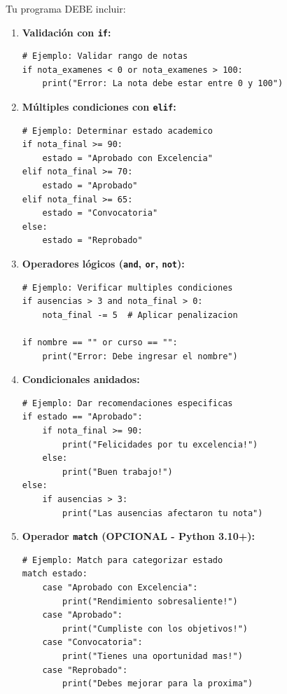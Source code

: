 \documentclass[12pt,a4paper]{article}
\begin{document}
Tu programa DEBE incluir:

\begin{enumerate}[leftmargin=*]
    \item \textbf{Validación con \texttt{if}:}
    \begin{lstlisting}
# Ejemplo: Validar rango de notas
if nota_examenes < 0 or nota_examenes > 100:
    print("Error: La nota debe estar entre 0 y 100")
    \end{lstlisting}
    
    \item \textbf{Múltiples condiciones con \texttt{elif}:}
    \begin{lstlisting}
# Ejemplo: Determinar estado academico
if nota_final >= 90:
    estado = "Aprobado con Excelencia"
elif nota_final >= 70:
    estado = "Aprobado"
elif nota_final >= 65:
    estado = "Convocatoria"
else:
    estado = "Reprobado"
    \end{lstlisting}
    
    \item \textbf{Operadores lógicos (\texttt{and}, \texttt{or}, \texttt{not}):}
    \begin{lstlisting}
# Ejemplo: Verificar multiples condiciones
if ausencias > 3 and nota_final > 0:
    nota_final -= 5  # Aplicar penalizacion
    
if nombre == "" or curso == "":
    print("Error: Debe ingresar el nombre")
    \end{lstlisting}
    
    \item \textbf{Condicionales anidados:}
    \begin{lstlisting}
# Ejemplo: Dar recomendaciones especificas
if estado == "Aprobado":
    if nota_final >= 90:
        print("Felicidades por tu excelencia!")
    else:
        print("Buen trabajo!")
else:
    if ausencias > 3:
        print("Las ausencias afectaron tu nota")
    \end{lstlisting}
    
    \item \textbf{Operador \texttt{match} (OPCIONAL - Python 3.10+):}
    \begin{lstlisting}
# Ejemplo: Match para categorizar estado
match estado:
    case "Aprobado con Excelencia":
        print("Rendimiento sobresaliente!")
    case "Aprobado":
        print("Cumpliste con los objetivos!")
    case "Convocatoria":
        print("Tienes una oportunidad mas!")
    case "Reprobado":
        print("Debes mejorar para la proxima")
    \end{lstlisting}
\end{enumerate}
\end{document}
